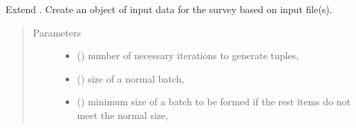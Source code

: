 \documentclass[a4paper,12pt,english]{sphinxmanual}
\begin{document}
\begin{fulllineitems}
\label{\detokenize{project_rst/generator:project.generator.DataGenerator}}
Extend {\hyperref[\detokenize{project_rst/generator:project.generator.BaseGenerator}]{}}. Create an object of input data for the
survey based on input file(s).
\begin{quote}\begin{description}
\item[{Parameters}] \leavevmode\begin{itemize}
\item {} 
 (\sphinxstyleliteralemphasis{\sphinxupquote{, }}) \textendash{} number of necessary iterations to generate
tuples,  

\item {} 
 (\sphinxstyleliteralemphasis{\sphinxupquote{, }}) \textendash{} size of a normal batch,  

\item {} 
 (\sphinxstyleliteralemphasis{\sphinxupquote{, }}) \textendash{} minimum size of a batch to be formed if the
rest items do not meet the normal size,  

\end{itemize}

\end{description}\end{quote}


\end{fulllineitems}
\end{document}
